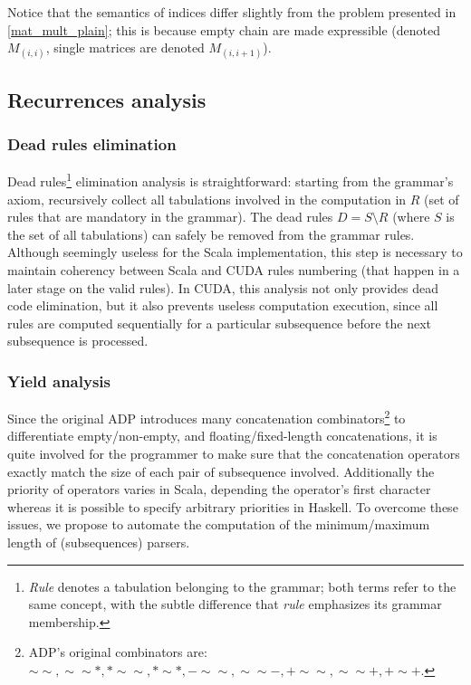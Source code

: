 Notice that the semantics of indices differ slightly from the problem presented in \ref{mat_mult_plain}; this is because empty chain are made expressible (denoted $M_{(i,i)}$, single matrices are denoted $M_{(i,i+1)}$).

\subsection{Recurrences analysis}
\subsubsection{Dead rules elimination}
Dead rules\footnote{\textit{Rule} denotes a tabulation belonging to the grammar; both terms refer to the same concept, with the subtle difference that \textit{rule} emphasizes its grammar membership.} elimination analysis is straightforward: starting from the grammar's axiom, recursively collect all tabulations involved in the computation in $R$ (set of rules that are mandatory in the grammar). The dead rules $D=S \setminus R$ (where $S$ is the set of all tabulations) can safely be removed from the grammar rules. Although seemingly useless for the Scala implementation, this step is necessary to maintain coherency between Scala and CUDA rules numbering (that happen in a later stage on the valid rules). In CUDA, this analysis not only provides dead code elimination, but it also prevents useless computation execution, since all rules are computed sequentially for a particular subsequence before the next subsequence is processed.

\subsubsection{Yield analysis}
Since the original ADP introduces many concatenation combinators\footnote{ADP's original combinators are: $\sim\sim, \sim\sim*, *\sim\sim, *\sim*, -\sim\sim, \sim\sim-, +\sim\sim, \sim\sim+, +\sim+$.} to differentiate empty/non-empty, and floating/fixed-length concatenations, it is quite involved for the programmer to make sure that the concatenation operators exactly match the size of each pair of subsequence involved. Additionally the priority of operators varies in Scala, depending the operator's first character whereas it is possible to specify arbitrary priorities in Haskell. To overcome these issues, we propose to automate the computation of the minimum/maximum length of (subsequences) parsers.

